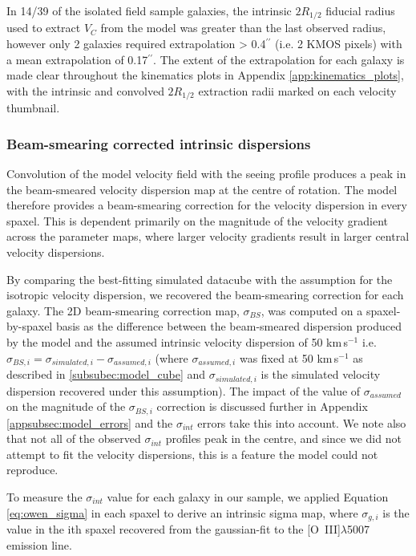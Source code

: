 \documentclass[fleqn,usenatbib]{mnras}
\begin{document}
In 14/39 of the isolated field sample galaxies, the intrinsic $2R_{1/2}$ fiducial radius used to extract $V_{C}$ from the model was greater than the last observed radius, however only 2 galaxies required extrapolation > 0.4$^{\prime\prime}$ (i.e. 2 KMOS pixels) with a mean extrapolation of 0.17$^{\prime\prime}$.
The extent of the extrapolation for each galaxy is made clear throughout the kinematics plots in Appendix \ref{app:kinematics_plots}, with the intrinsic and convolved $2R_{1/2}$ extraction radii marked on each velocity thumbnail.

\subsubsection{Beam-smearing corrected intrinsic dispersions}\label{subsubsec:beam_smearing_corrected_dispersions}
Convolution of the model velocity field with the seeing profile produces a peak in the beam-smeared velocity dispersion map at the centre of rotation.
The model therefore provides a beam-smearing correction for the velocity dispersion in every spaxel.
This is dependent primarily on the magnitude of the velocity gradient across the parameter maps, where larger velocity gradients result in larger central velocity dispersions.

By comparing the best-fitting simulated datacube with the assumption for the isotropic velocity dispersion, we recovered the beam-smearing correction for each galaxy.
The 2D beam-smearing correction map, $\sigma_{BS}$, was computed on a spaxel-by-spaxel basis as the difference between the beam-smeared dispersion produced by the model and the assumed intrinsic velocity dispersion of 50 km\,s$^{-1}$ i.e. $\sigma_{BS,i} = \sigma_{simulated,i} - \sigma_{assumed,i}$ (where $\sigma_{assumed,i}$ was fixed at 50 km\,s$^{-1}$ as described in \cref{subsubec:model_cube} and $\sigma_{simulated,i}$ is the simulated velocity dispersion recovered under this assumption).
The impact of the value of $\sigma_{assumed}$ on the magnitude of the $\sigma_{BS,i}$ correction is discussed further in Appendix \ref{appsubsec:model_errors} and the $\sigma_{int}$ errors take this into account.
We note also that not all of the observed $\sigma_{int}$ profiles peak in the centre, and since we did not attempt to fit the velocity dispersions, this is a feature the model could not reproduce. 

To measure the $\sigma_{int}$ value for each galaxy in our sample, we applied Equation \ref{eq:owen_sigma} in each spaxel to derive an intrinsic sigma map, where $\sigma_{g,i}$ is the value in the ith spaxel recovered from the gaussian-fit to the [O~{\sc III}]$\lambda$5007 emission line.
\end{document}
